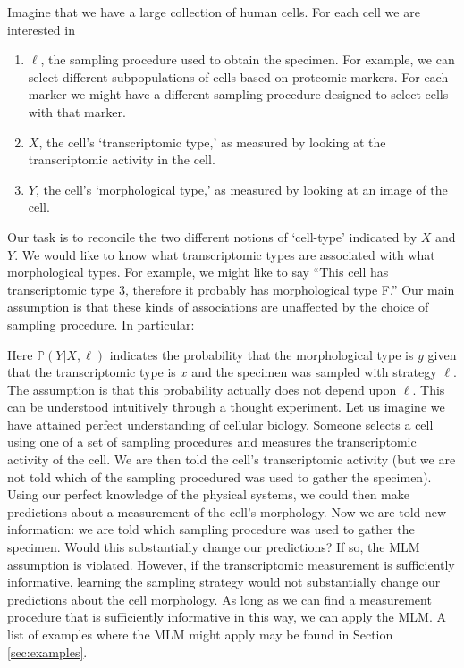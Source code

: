 Imagine that we have a large collection of human cells.  For each cell we are interested in 
%
\begin{enumerate}
    \item $\ell$, the sampling procedure used to obtain the specimen.  For example, we can select different subpopulations of cells based on proteomic markers.  For each marker we might have a different sampling procedure designed to select cells with that marker.
    \item $X$, the cell's `transcriptomic type,' as measured by looking at the transcriptomic activity in the cell.  
    \item $Y$, the cell's `morphological type,' as measured by looking at an image of the cell.
\end{enumerate}
%
Our task is to reconcile the two different notions of `cell-type' indicated by $X$ and $Y$.  We would like to know what transcriptomic types are associated with what morphological types.  For example, we might like to say ``This cell has transcriptomic type 3, therefore it probably has morphological type F.''  Our main assumption is that these kinds of associations are unaffected by the choice of sampling procedure.  In particular:

\begin{center}
\end{center}

Here $\mathbb{P}(Y|X,\ell)$ indicates the probability that the morphological type is $y$ given that the transcriptomic type is $x$ and the specimen was sampled with strategy $\ell$.  The assumption is that this probability actually does not depend upon $\ell$.  This can be understood intuitively through a thought experiment.  Let us imagine we have attained perfect understanding of cellular biology.  Someone selects a cell using one of a set of sampling procedures and measures the transcriptomic activity of the cell.  We are then told the cell's transcriptomic activity (but we are not told which of the sampling procedured was used to gather the specimen).  Using our perfect knowledge of the physical systems, we could then make predictions about a measurement of the cell's morphology.  Now we are told new information: we are told which sampling procedure was used to gather the specimen.  Would this substantially change our predictions?  If so, the MLM assumption is violated.  However, if the transcriptomic measurement is sufficiently informative, learning the sampling strategy would not substantially change our predictions about the cell morphology.  As long as we can find a measurement procedure that is sufficiently informative in this way, we can apply the MLM.  A list of examples where the MLM might apply may be found in Section \ref{sec:examples}.

